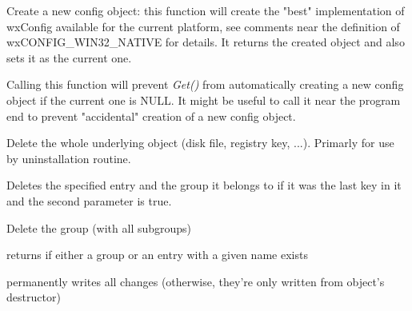 Create a new config object: this function will create the "best"
implementation of wxConfig available for the current platform, see comments
near the definition of wxCONFIG\_WIN32\_NATIVE for details. It returns the
created object and also sets it as the current one.


\label{wxconfigbasedontcreateondemand}


Calling this function will prevent {\it Get()} from automatically creating a
new config object if the current one is NULL. It might be useful to call it
near the program end to prevent "accidental" creation of a new config object.


\label{wxconfigbasedeleteall}


Delete the whole underlying object (disk file, registry key, ...). Primarly
for use by uninstallation routine.


\label{wxconfigbasedeleteentry}


Deletes the specified entry and the group it belongs to if it was the last key
in it and the second parameter is true.


\label{wxconfigbasedeletegroup}


Delete the group (with all subgroups)


\label{wxconfigbaseexists}


returns \true if either a group or an entry with a given name exists


\label{wxconfigbaseflush}


permanently writes all changes (otherwise, they're only written from object's
destructor)


\label{wxconfigbaseget}


